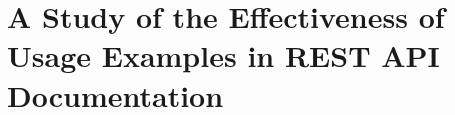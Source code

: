 



%
\chapter{A Study of the Effectiveness of Usage Examples in REST API Documentation}
\label{chapter:controlled_study}




